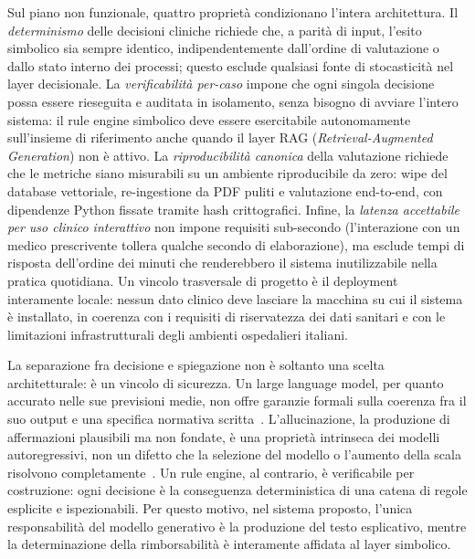 Sul piano non funzionale, quattro proprietà condizionano l'intera architettura.
Il \emph{determinismo} delle decisioni cliniche richiede che,
a parità di input, l'esito simbolico sia sempre identico, indipendentemente
dall'ordine di valutazione o dallo stato interno dei processi;
questo esclude qualsiasi fonte di stocasticità nel layer decisionale.
La \emph{verificabilità per-caso} impone che ogni singola decisione possa
essere rieseguita e auditata in isolamento, senza bisogno di avviare
l'intero sistema: il rule engine simbolico deve essere esercitabile
autonomamente sull'insieme di riferimento anche quando il layer RAG (\emph{Retrieval-Augmented Generation}) non è attivo.
La \emph{riproducibilità canonica} della valutazione richiede che
le metriche siano misurabili su un ambiente riproducibile da zero:
wipe del database vettoriale, re-ingestione da PDF puliti e valutazione
end-to-end, con dipendenze Python fissate tramite hash crittografici.
Infine, la \emph{latenza accettabile per uso clinico interattivo} non
impone requisiti sub-secondo (l'interazione con un medico prescrivente
tollera qualche secondo di elaborazione), ma esclude tempi di risposta
dell'ordine dei minuti che renderebbero il sistema inutilizzabile nella
pratica quotidiana.
Un vincolo trasversale di progetto è il deployment interamente locale:
nessun dato clinico deve lasciare la macchina su cui il sistema è installato,
in coerenza con i requisiti di riservatezza dei dati sanitari e con
le limitazioni infrastrutturali degli ambienti ospedalieri italiani.

La separazione fra decisione e spiegazione non è soltanto una scelta
architetturale: è un vincolo di sicurezza.
Un large language model, per quanto accurato nelle sue previsioni medie,
non offre garanzie formali sulla coerenza fra il suo output e una specifica
normativa scritta~\cite{ji2023hallucination}.
L'allucinazione, la produzione di affermazioni plausibili ma non fondate,
è una proprietà intrinseca dei modelli autoregressivi, non un difetto
che la selezione del modello o l'aumento della scala risolvono
completamente~\cite{thirunavukarasu2023llm}.
Un rule engine, al contrario, è verificabile per costruzione:
ogni decisione è la conseguenza deterministica di una catena di regole
esplicite e ispezionabili.
Per questo motivo, nel sistema proposto, l'unica responsabilità del
modello generativo è la produzione del testo esplicativo, mentre
la determinazione della rimborsabilità è interamente affidata
al layer simbolico.

